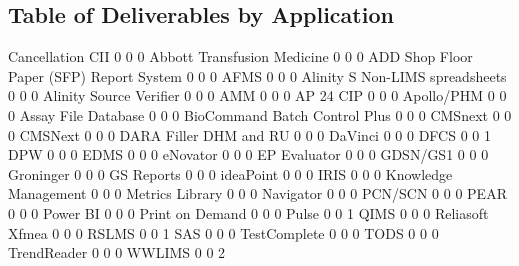 \documentclass{article}
\begin{document}
\subsection{Table of Deliverables by Application}
\begin{Schunk}
\begin{Soutput}
                                              Cancellation CII
                                            0            0   0
  Abbott Transfusion Medicine               0            0   0
  ADD Shop Floor Paper (SFP) Report System  0            0   0
  AFMS                                      0            0   0
  Alinity S Non-LIMS spreadsheets           0            0   0
  Alinity Source Verifier                   0            0   0
  AMM                                       0            0   0
  AP 24 CIP                                 0            0   0
  Apollo/PHM                                0            0   0
  Assay File Database                       0            0   0
  BioCommand Batch Control Plus             0            0   0
  CMSnext                                   0            0   0
  CMSNext                                   0            0   0
  DARA Filler DHM and RU                    0            0   0
  DaVinci                                   0            0   0
  DFCS                                      0            0   1
  DPW                                       0            0   0
  EDMS                                      0            0   0
  eNovator                                  0            0   0
  EP Evaluator                              0            0   0
  GDSN/GS1                                  0            0   0
  Groninger                                 0            0   0
  GS Reports                                0            0   0
  ideaPoint                                 0            0   0
  IRIS                                      0            0   0
  Knowledge Management                      0            0   0
  Metrics Library                           0            0   0
  Navigator                                 0            0   0
  PCN/SCN                                   0            0   0
  PEAR                                      0            0   0
  Power BI                                  0            0   0
  Print on Demand                           0            0   0
  Pulse                                     0            0   1
  QIMS                                      0            0   0
  Reliasoft Xfmea                           0            0   0
  RSLMS                                     0            0   1
  SAS                                       0            0   0
  TestComplete                              0            0   0
  TODS                                      0            0   0
  TrendReader                               0            0   0
  WWLIMS                                    0            0   2
                                          

\end{Soutput}
\end{Schunk}
\end{document}
